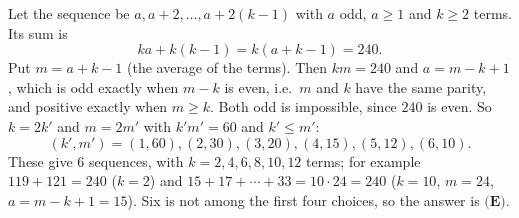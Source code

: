 Let the sequence be $a,a+2,\dots,a+2(k-1)$ with $a$ odd, $a\ge1$ and $k\ge2$ terms. Its sum is
\[
ka+k(k-1)=k(a+k-1)=240 .
\]
Put $m=a+k-1$ (the average of the terms). Then $km=240$ and $a=m-k+1$, which is odd exactly when $m-k$ is even, i.e.\ $m$ and $k$ have the same parity, and positive exactly when $m\ge k$. Both odd is impossible, since $240$ is even. So $k=2k'$ and $m=2m'$ with $k'm'=60$ and $k'\le m'$:
\[
(k',m')=(1,60),(2,30),(3,20),(4,15),(5,12),(6,10).
\]
These give $6$ sequences, with $k=2,4,6,8,10,12$ terms; for example $119+121=240$ ($k=2$) and $15+17+\cdots+33=10\cdot24=240$ ($k=10$, $m=24$, $a=m-k+1=15$). Six is not among the first four choices, so the answer is $\boxed{\textbf{(E)}}$.
